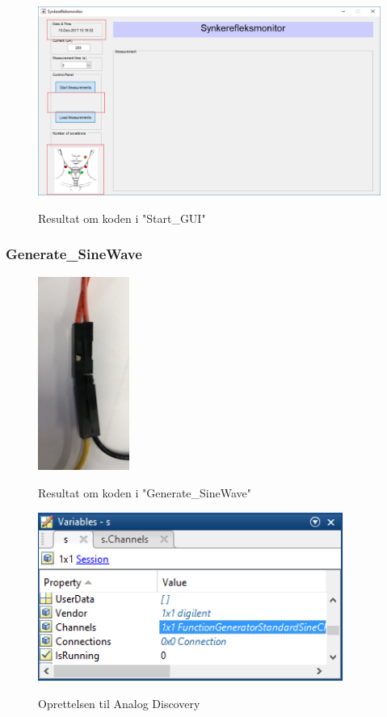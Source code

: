 \begin{figure}[H] 
\centering
{\includegraphics[width=\linewidth]
{Figure/modultestGUI}}
\caption{Resultat om koden i "Start\_GUI"}
\label{fig:aafiltermodultest}
\end{figure}


\subsubsection{Generate\_SineWave} 

\begin{figure}[H] 
\centering
{\includegraphics[width=3cm]
{Figure/modultestsinus2}}
\caption{Resultat om koden i "Generate\_SineWave"}
\label{fig:modultestsinus1}
\end{figure}


\begin{figure}[H] 
\centering
{\includegraphics[width=10cm]
{Figure/modultestsinus3}}
\caption{Oprettelsen til Analog Discovery}
\label{fig:modultestsinus3}
\end{figure}



